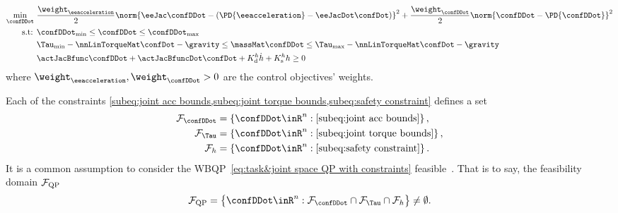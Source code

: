 \begin{subequations}\label{eq:task&joint space QP with constraints}
	\begin{align}
		\underset{\confDDot}{\min} \ &\frac{\weight_{\eeacceleration}}{2}\norm{\eeJac \confDDot  - \left( \PD{\eeacceleration} - \eeJacDot \confDot \right)}^2  + \frac{\weight_{\confDDot}}{2}\norm{ \confDDot  -  \PD{\confDDot}}^2 \\
		\label{subeq:joint acc bounds}\text{s.t: }&{\confDDot}_{\min} \leq \confDDot \leq {\confDDot}_{\max} \\
		&\label{subeq:joint torque bounds}{\Tau}_{\min} - \nnLinTorqueMat\confDot - \gravity \leq \massMat\confDDot \leq {\Tau}_{\max}- \nnLinTorqueMat\confDot - \gravity \\ 
		& \label{subeq:safety constraint}\actJacBfunc\confDDot+\actJacBfuncDot\confDot + K_{\rm d}^{h} \dot{h} + K_{\rm s}^{h} h \geq0
	\end{align}
\end{subequations} 
where $\weight_{\eeacceleration},\weight_{\confDDot}>0$ are the control objectives' weights. 

Each of the constraints \cref{subeq:joint acc bounds,subeq:joint torque bounds,subeq:safety constraint} defines a set
	\begin{align}
		\label{eq:set acc bounds}{\cal F}_{\confDDot} &= \left\{\confDDot\inR^{n}:\cref{subeq:joint acc bounds}\right\}, \\ 
		\label{eq:set torque bounds}{\cal F}_{\Tau} &= \left\{\confDDot\inR^{n}:\cref{subeq:joint torque bounds}\right\}, \\ 
		\label{eq:set safety constraint}{\cal F}_{h} &= \left\{\confDDot\inR^{n}:\cref{subeq:safety constraint}\right\} .
	\end{align}
It is a common assumption to consider the   WBQP~\cref{eq:task&joint space QP with constraints} feasible~\cite{morris2013cdc,ames2017tac,ames2019ecc,ames2021csl}. That is to say, the feasibility domain ${\cal F}_{\rm QP}$ 
\begin{align}\label{eq:feasibility domain}
	{\cal F}_{\rm QP} = \begin{Bmatrix}
		\confDDot\inR^{n}: {\cal F}_{\confDDot} \cap {\cal F}_{\Tau} \cap {\cal F}_{h} 
	\end{Bmatrix} \neq \emptyset.
\end{align}

